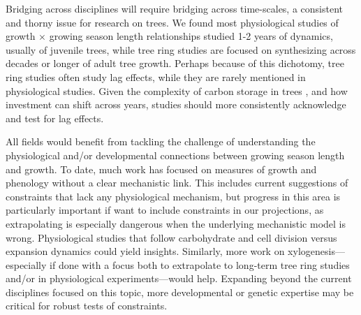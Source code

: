 \documentclass[11pt]{article}
\begin{document}
Bridging across disciplines will require bridging across time-scales, a consistent and thorny issue for research on trees. We found most physiological studies of growth $\times$ growing season length relationships studied 1-2 years of dynamics, usually of juvenile trees, while tree ring studies are focused on synthesizing across decades or longer of adult tree growth. Perhaps because of this dichotomy, tree ring studies often study lag effects, while they are rarely mentioned in physiological studies. Given the complexity of carbon storage in trees \citep{finzi2020,thompson2023no,anderson2022drives}, and how investment can shift across years, studies should more consistently acknowledge and test for lag effects. %

All fields would benefit from tackling the challenge of understanding the physiological and/or developmental connections between growing season length and growth. To date, much work has focused on measures of growth and phenology without a clear mechanistic link. This includes current suggestions of constraints that lack any physiological mechanism, but progress in this area is particularly important if want to include constraints in our projections, as extrapolating is especially dangerous when the underlying mechanistic model is wrong. Physiological studies that follow carbohydrate and cell division versus expansion dynamics could yield insights. Similarly, more work on xylogenesis---especially if done with a focus both to extrapolate to long-term tree ring studies and/or in physiological experiments---would help. Expanding beyond the current disciplines focused on this topic, more developmental or genetic expertise may be critical for robust tests of constraints. 
\end{document}
